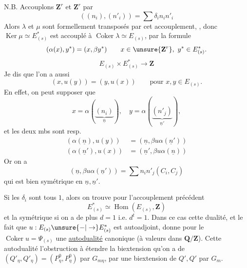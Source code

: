 N.B. Accouplons $\mathbf Z^r$ et $\mathbf Z^r$ par
\[
((n_i),(n'_i))=\sum\delta_i n_i n'_i
\]
Alors $\lambda$ et $\mu$ sont formellement transposés par cet accouplement,
, donc $\operatorname{Ker}\mu\simeq E^*_{(s)}$ est accouplé à $\operatorname{Coker}\lambda\simeq E_{(s)}$, par la formule
\[
(\alpha(x),y^*)=(x,\beta y^*)\qquad x\in\unsure{\mathbf Z^r},\ y^*\in E^*_{(s)}.
\]
\[
E_{(s)}\times E^*_{(s)}\longrightarrow\mathbf Z
\]
 Je dis que l'on a aussi
\[
(x,u(y))=(y,u(x))\qquad\text{pour }x,y\in E_{(s)}.
\]
En effet, on peut supposer que
\[
x=\alpha(\underbrace{(n_i)}_{\underline n}),\quad y=\alpha(\underbrace{(n'_j)}_{\underline n'}),
\]
et les deux mbs sont resp.
\[
\begin{aligned}
(\alpha(\underline n),u(y))&=(\underline n,\beta u\alpha(\underline n'))\\
(\alpha(\underline n'),u(x))&=(\underline n',\beta u\alpha(\underline n))
\end{aligned}
\]
Or on a
\[
(\underline n,\beta u\alpha(\underline n'))=\sum n_i n'_j(C_i,C_j)
\]
qui est bien symétrique en  $\underline n,\underline n'$.

Si les $\delta_i$ sont tous $1$, alors on trouve pour l'accouplement précédent
\[
E^*_{(s)}\simeq\operatorname{Hom}(E_{(s)},\mathbf Z)
\]
et la  symétrique si on a de plus $d=1$ i.e. $d^t=1$.
Dans ce cas cette dualité, et le fait que $u:E_{(s)}\unsure{-|\to}E^*_{(s)}$ est autoadjoint, donne pour le $\operatorname{Coker}u=\Psi_{(s)}$ une \uline{autodualité} canonique (à valeurs dans $\mathbf Q/\mathbf Z$). Cette autodualité  l'obstruction à étendre la biextension qu'on a de $(Q'_\eta,Q'_\eta)=(P^0_\eta,P^0_\eta)$ par $G_{m\eta}$, par une biextension de $Q',Q'$ par $G_m$.
